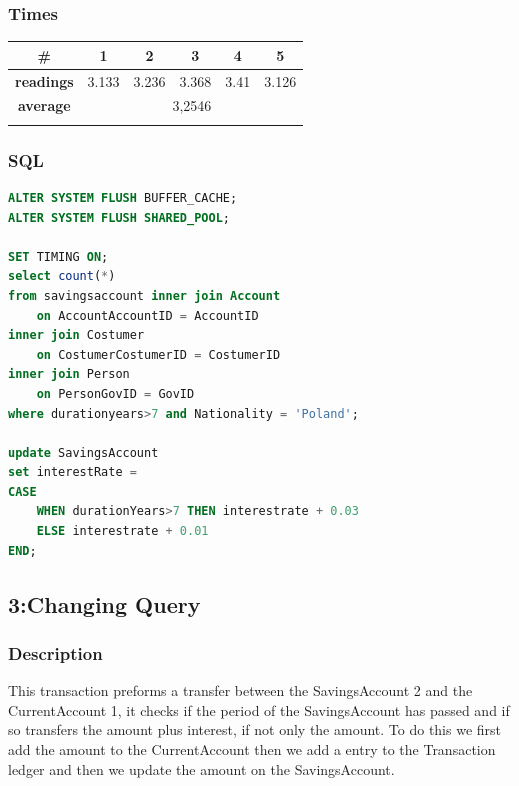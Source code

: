\documentclass[a4paper, 10pt]{article}
\begin{document}
\subsubsection{Times}
\begin{table}[H]
\centering
\begin{tabular}{cccccc}
\hline
\multicolumn{1}{|c|}{\textbf{\#}}       & \multicolumn{1}{c|}{\textbf{1}} & \multicolumn{1}{c|}{\textbf{2}} & \multicolumn{1}{c|}{\textbf{3}} & \multicolumn{1}{c|}{\textbf{4}} & \multicolumn{1}{c|}{\textbf{5}} \\ \hline
\multicolumn{1}{|c|}{\textbf{readings}} & \multicolumn{1}{c|}{3.133}           & \multicolumn{1}{c|}{3.236}           & \multicolumn{1}{c|}{3.368}           & \multicolumn{1}{c|}{3.41}           & \multicolumn{1}{c|}{3.126}           \\ \hline
\multicolumn{1}{|c|}{\textbf{average}}      & \multicolumn{5}{c|}{3,2546}                                                                                                                                                   \\ \hline
\textbf{}                               & \textbf{}                       & \textbf{}                       & \textbf{}                       & \textbf{}                       & \textbf{}                      
\end{tabular}
\end{table}
\subsubsection{SQL}
\begin{lstlisting}[language=SQL]
ALTER SYSTEM FLUSH BUFFER_CACHE;
ALTER SYSTEM FLUSH SHARED_POOL;

SET TIMING ON;
select count(*)
from savingsaccount inner join Account
    on AccountAccountID = AccountID
inner join Costumer
    on CostumerCostumerID = CostumerID
inner join Person
    on PersonGovID = GovID
where durationyears>7 and Nationality = 'Poland';

update SavingsAccount
set interestRate =
CASE
    WHEN durationYears>7 THEN interestrate + 0.03
    ELSE interestrate + 0.01
END;

\end{lstlisting}

\subsection{3:Changing Query}
\subsubsection{Description}
This transaction preforms a transfer between the SavingsAccount 2 and the CurrentAccount 1, it checks if the period of the SavingsAccount has passed and if so transfers the amount plus interest, if not only the amount. To do this we first add the amount to the CurrentAccount then we add a entry to the Transaction ledger and then we update the amount on the SavingsAccount.
\end{document}
